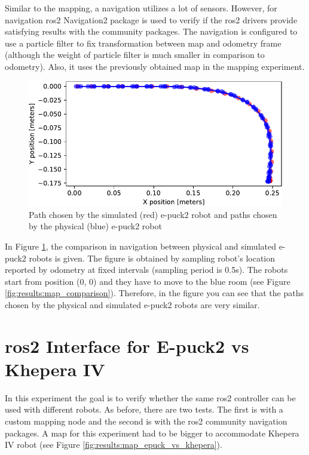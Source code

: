 Similar to the mapping, a navigation utilizes a lot of sensors.
However, for navigation \ac{ros2} Navigation2 package is used to verify if the \ac{ros2} drivers provide satisfying results with the community packages.
The navigation is configured to use a particle filter to fix transformation between map and odometry frame (although the weight of particle filter is much smaller in comparison to odometry).
Also, it uses the previously obtained map in the mapping experiment.

\begin{figure}[H]
    \centering
    \includegraphics[width=\textwidth]{./results/figures/navigation_comparison.pdf}
    \caption{Path chosen by the simulated (red) e-puck2 robot and paths chosen by the physical (blue) e-puck2 robot}
    \label{fig:results:navigation_comparison}
\end{figure}

In Figure \ref{fig:results:navigation_comparison}, the comparison in navigation between physical and simulated e-puck2 robots is given.
The figure is obtained by sampling robot's location reported by odometry at fixed intervals (sampling period is 0.5s).
The robots start from position (0, 0) and they have to move to the blue room (see Figure \ref{fig:results:map_comparison}).
Therefore, in the figure you can see that the paths chosen by the physical and simulated e-puck2 robots are very similar.  

\section{\ac{ros2} Interface for E-puck2 vs Khepera IV}

In this experiment the goal is to verify whether the same \ac{ros2} controller can be used with different robots.
As before, there are two tests.
The first is with a custom mapping node and the second is with the \ac{ros2} community navigation packages.
A map for this experiment had to be bigger to accommodate Khepera IV robot (see Figure \ref{fig:results:map_epuck_vs_khepera}).

